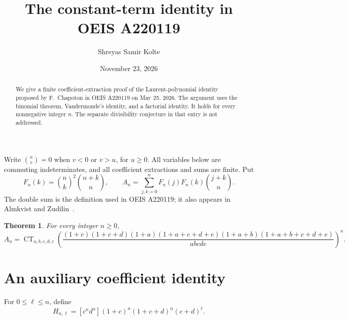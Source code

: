 \documentclass[11pt]{article}
\title{The constant-term identity in OEIS A220119}
\author{Shreyas Samir Kolte}
\date{November 23, 2026}
\newtheorem{theorem}{Theorem}
\newcommand{\CT}{\operatorname{CT}}
\newcommand{\bn}[2]{\binom{#1}{#2}}
\begin{document}
\maketitle
\begin{abstract}
We give a finite coefficient-extraction proof of the Laurent-polynomial
identity proposed by F.~Chapoton in OEIS A220119 on May 25, 2026.
The argument uses the binomial theorem, Vandermonde's identity, and a
factorial identity. It holds for every nonnegative integer $n$.
The separate divisibility conjecture in that entry is not addressed.
\end{abstract}

Write $\bn uv=0$ when $v<0$ or $v>u$, for $u\geq0$.
All variables below are commuting indeterminates, and all coefficient
extractions and sums are finite.
Put
\[
 F_n(k)=\bn nk^2\bn{n+k}n,\qquad
 A_n=\sum_{j,k=0}^{n}F_n(j)F_n(k)\bn{j+k}n.
\]
The double sum is the definition used in OEIS A220119; it also appears
in Almkvist and Zudilin~\cite[Section 4]{AZ}.

\begin{theorem}\label{thm:main}
For every integer $n\geq0$,
\[
 A_n=\CT_{a,b,c,d,e}
 \left(
 \frac{(1+c)(1+c+d)(1+a)(1+a+c+d+e)
 (1+a+b)(1+a+b+c+d+e)}
 {abcde}
 \right)^n.
\]
\end{theorem}

\section*{An auxiliary coefficient identity}
For $0\leq\ell\leq n$, define
\[
 H_{n,\ell}=[c^nd^n](1+c)^n(1+c+d)^n(c+d)^\ell.
\]
\end{document}
